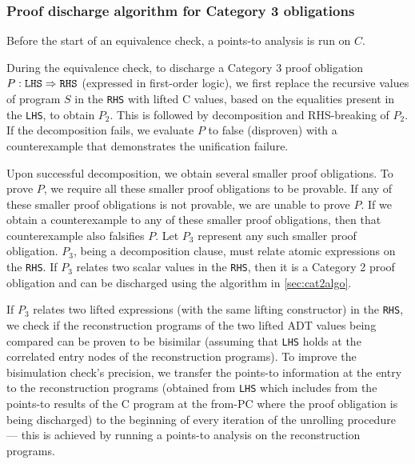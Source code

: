 \vspace{-5px}
\subsubsection{Proof discharge algorithm for Category 3 obligations}
\label{sec:cat3summary}

\noindent
Before the start of an equivalence check, a points-to analysis is run on $C$.

During the equivalence check,
to discharge a Category 3 proof obligation $P: {\tt LHS}\Rightarrow{\tt RHS}$ (expressed
in first-order logic), we first replace the recursive
values of program $S$ in the {\tt RHS}
with lifted C values, based on the equalities present in the {\tt LHS}, to
obtain $P_2$.
This is followed by decomposition and RHS-breaking of $P_2$.
If the decomposition
fails, we evaluate $P$ to false (disproven) with a counterexample
that demonstrates the unification failure.

Upon successful decomposition, we
obtain several smaller proof obligations.
To
prove $P$, we require all these smaller proof
obligations to be provable. If any of these smaller proof obligations
is not provable, we are unable to prove $P$.  If we obtain a counterexample
to any of these smaller proof obligations, then that counterexample
also falsifies $P$.
Let $P_3$ represent any such smaller proof obligation. $P_3$, being
a decomposition clause,
must relate atomic expressions on the {\tt RHS}.
If $P_3$ relates two scalar values in the {\tt RHS}, then
it is
a Category 2 proof obligation and can be discharged
using the algorithm in \cref{sec:cat2algo}.

If $P_3$ relates two lifted
expressions (with the same lifting constructor) in
the {\tt RHS},
we check if the reconstruction
programs of the two lifted ADT values being
compared can be proven to be bisimilar (assuming that
{\tt LHS} holds at the correlated entry nodes
of the reconstruction programs).
To improve
the bisimulation
check's precision, we transfer the points-to information at the entry to the
reconstruction programs (obtained from {\tt LHS} which includes
from the points-to results of the C program at the
from-PC where the proof obligation is being discharged)
to the beginning of every iteration
of the unrolling procedure --- this is
achieved by running a points-to analysis
on the reconstruction programs.

